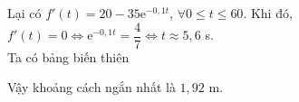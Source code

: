 \begin{ex}
{\begin{itemchoice}
		Lại có $f'(t)=20-35\mathrm{e}^{-0{,}1t}$, $\forall 0\le t\le 60$. Khi đó, $f'(t)=0\Leftrightarrow \mathrm{e}^{-0{,}1t}=\dfrac{4}{7}\Leftrightarrow t\approx 5{,}6$ s.\\
		Ta có bảng biến thiên
		\begin{center}
		\end{center}
		Vậy khoảng cách ngắn nhất là $1{,}92$ m.
	\end{itemchoice}}
\end{ex}
\renewcommand{\baselinestretch}{1.5}
